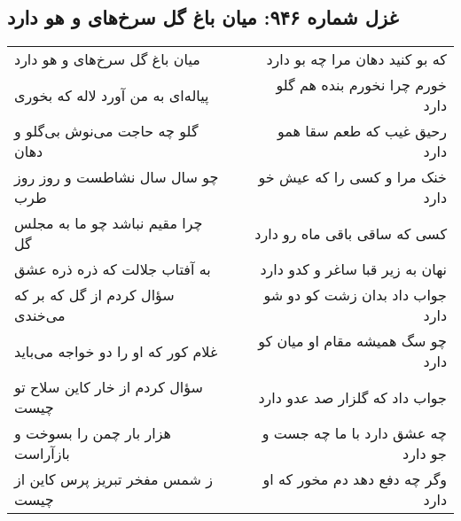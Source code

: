 \begin{center}
\section*{غزل شماره ۹۴۶: میان باغ گل سرخ‌های و هو دارد}
\label{sec:0946}
\begin{longtable}{l p{0.5cm} r}
میان باغ گل سرخ‌های و هو دارد
&&
که بو کنید دهان مرا چه بو دارد
\\
پیاله‌ای به من آورد لاله که بخوری
&&
خورم چرا نخورم بنده هم گلو دارد
\\
گلو چه حاجت می‌نوش بی‌گلو و دهان
&&
رحیق غیب که طعم سقا همو دارد
\\
چو سال سال نشاطست و روز روز طرب
&&
خنک مرا و کسی را که عیش خو دارد
\\
چرا مقیم نباشد چو ما به مجلس گل
&&
کسی که ساقی باقی ماه رو دارد
\\
به آفتاب جلالت که ذره ذره عشق
&&
نهان به زیر قبا ساغر و کدو دارد
\\
سؤال کردم از گل که بر که می‌خندی
&&
جواب داد بدان زشت کو دو شو دارد
\\
غلام کور که او را دو خواجه می‌باید
&&
چو سگ همیشه مقام او میان کو دارد
\\
سؤال کردم از خار کاین سلاح تو چیست
&&
جواب داد که گلزار صد عدو دارد
\\
هزار بار چمن را بسوخت و بازآراست
&&
چه عشق دارد با ما چه جست و جو دارد
\\
ز شمس مفخر تبریز پرس کاین از چیست
&&
وگر چه دفع دهد دم مخور که او دارد
\\
\end{longtable}
\end{center}
